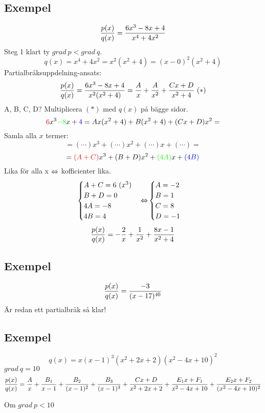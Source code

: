 \documentclass{article}
\begin{document}
\subsection{Exempel}
$$ \frac{p(x)}{q(x)} = \frac{6x^3-8x+4}{x^4+4x^2} $$
Steg 1 klart ty $grad\ p < grad\ q$.
$$ q(x)= x^4+4x^2 = x^2(x^2+4)=(x-0)^2(x^2+4)$$
Partialbråksuppdelning-ansats:
$$ \pq = \f{6x^3-8x+4}{x^2(x^2+4)} = \f Ax + \f A{x^2} +\f {Cx+D}{x^2+4}\ (*)$$
A, B, C, D? Multiplicera $(*)$ med $q(x)$ på bägge sidor.
$${\color{red}6}x^3{\color{green}-8}x+{\color{blue}4} = Ax(x^2+4) + B(x^2+4) + (Cx+D)x^2 =$$
Samla alla $x$ termer:
$$=(\cdots)x^3 + (\cdots)x^2 + (\cdots)x + (\cdots) =$$
$$={\color{red}(A+C)}x^3 + {\color{black}(B+D)}x^2 + {\color{green}(4A)}x + {\color{blue}(4B)}$$
Lika för alla x $\operatorname{\Leftrightarrow}$ kofficienter lika.
$$
\begin{cases}
A+C = 6\ (x^3)\\
B+D = 0\\
4A=-8\\
4B=4
\end{cases}
\operatorname{\Leftrightarrow}
\begin{cases}
A=-2\\
B=1\\
C=8\\
D=-1
\end{cases}
$$
$$ \frac{p(x)}{q(x)} = -\frac{2}{x} + \frac{1}{x^2} + \frac{8x-1}{x^2+4} $$

\subsection{Exempel}
$$ \frac{p(x)}{q(x)} = \frac{-3}{(x-17)^{40}} $$
Är redan ett partialbråk så klar!

\subsection{Exempel}
$$q(x)=x(x-1)^3(x^2+2x+2)(x^2-4x+10)^2$$
$grad\ q = 10$
$$ \frac{p(x)}{q(x)} = \frac{A}{x} + \frac{B_1}{x-1} + \frac{B_2}{(x-1)^2}+\frac{B_3}{(x-1)^3} + \frac{Cx+D}{x^2+2x+2} +
\frac{E_1x+F_1}{x^2-4x+10}+\frac{E_2x+F_2}{(x^2-4x+10)^2}$$

Om $grad\ p < 10$
\end{document}
